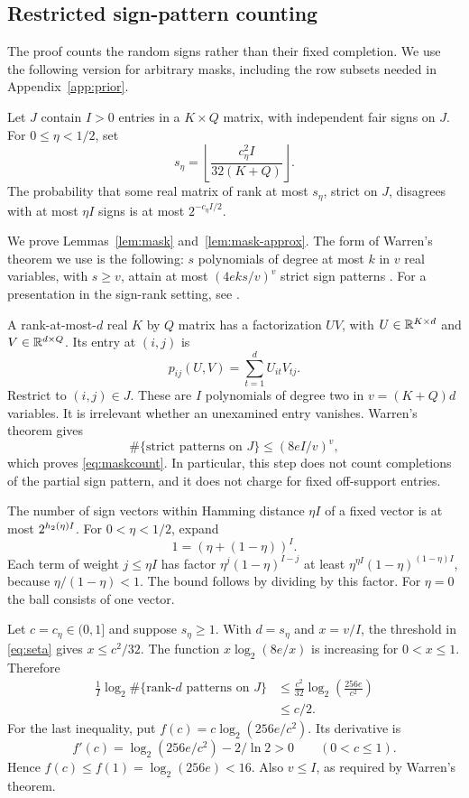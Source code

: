\subsection{Restricted sign-pattern counting}
The proof counts the random signs rather than their fixed completion. We use the following version for arbitrary masks, including the row subsets needed in Appendix~\ref{app:prior}.
\begin{lemma}\label{lem:mask-approx}
Let $J$ contain $I>0$ entries in a $K\times Q$ matrix, with independent fair signs on $J$. For $0\le\eta<1/2$, set
\[
 s_\eta=\left\lfloor\frac{c_\eta^2 I}{32(K+Q)}\right\rfloor.
\]
The probability that some real matrix of rank at most $s_\eta$, strict on $J$, disagrees with at most $\eta I$ signs is at most $2^{-c_\eta I/2}$.
\end{lemma}
We prove Lemmas~\ref{lem:mask} and~\ref{lem:mask-approx}. The form of Warren's theorem we use is the following: $s$ polynomials of degree at most $k$ in $v$ real variables, with $s\ge v$, attain at most $(4eks/v)^v$ strict sign patterns \citep{Warren68}. For a presentation in the sign-rank setting, see \citet{AMY16}.

A rank-at-most-$d$ real $K$ by $Q$ matrix has a factorization $UV$, with $U\in\mathbb R^{K\times d}$ and $V\in\mathbb R^{d\times Q}$. Its entry at $(i,j)$ is
\[
 p_{ij}(U,V)=\sum_{t=1}^{d}U_{it}V_{tj}.
\]
Restrict to $(i,j)\in J$. These are $I$ polynomials of degree two in $v=(K+Q)d$ variables. It is irrelevant whether an unexamined entry vanishes. Warren's theorem gives
\[
 \#\{\text{strict patterns on }J\}
 \le (8eI/v)^v,
\]
which proves \eqref{eq:maskcount}. In particular, this step does not count completions of the partial sign pattern, and it does not charge for fixed off-support entries.

The number of sign vectors within Hamming distance $\eta I$ of a fixed vector is at most $2^{h_2(\eta)I}$. For $0<\eta<1/2$, expand
\[
 1=(\eta+(1-\eta))^I.
\]
Each term of weight $j\le\eta I$ has factor $\eta^j(1-\eta)^{I-j}$ at least $\eta^{\eta I}(1-\eta)^{(1-\eta)I}$, because $\eta/(1-\eta)<1$. The bound follows by dividing by this factor. For $\eta=0$ the ball consists of one vector.

Let $c=c_\eta\in(0,1]$ and suppose $s_\eta\ge1$. With $d=s_\eta$ and $x=v/I$, the threshold in \eqref{eq:seta} gives $x\le c^2/32$. The function $x\log_2(8e/x)$ is increasing for $0<x\le1$. Therefore
\begin{align*}
 \frac1I\log_2\#\{\text{rank-}d\text{ patterns on }J\}
 &\le \frac{c^2}{32}\log_2\left(\frac{256e}{c^2}\right)\\
 &\le c/2.
\end{align*}
For the last inequality, put $f(c)=c\log_2(256e/c^2)$. Its derivative is
\[
 f'(c)=\log_2(256e/c^2)-2/\ln2>0\qquad(0<c\le1).
\]
Hence $f(c)\le f(1)=\log_2(256e)<16$. Also $v\le I$, as required by Warren's theorem.

